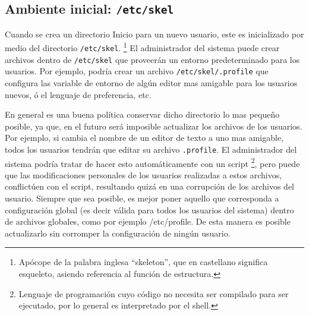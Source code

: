 \documentclass[12pt]{article}
\begin{document}

\subsection{Ambiente inicial: \texttt{/etc/skel}}

Cuando se crea un directorio Inicio para un nuevo usuario, este es
inicializado por medio del directorio \texttt{/etc/skel}. 
\footnote{Apócope de la palabra inglesa ``skeleton'', que en castellano 
significa esqueleto, asiendo referencia al función de estructura.} El
administrador del sistema puede crear archivos dentro de
\texttt{/etc/skel} que proveerán un entorno predeterminado
para los usuarios. Por ejemplo, podría crear un archivo 
\texttt{/etc/skel/.profile} que configura las variable de entorno
de algún editor mas amigable para los usuarios nuevos, ó el lenguaje 
de preferencia, etc. 


En general es una buena política conservar dicho directorio lo mas pequeño
posible, ya que, en el futuro será imposible actualizar los archivos de
los usuarios. Por ejemplo, si cambia el nombre de un editor de texto a uno mas amigable,
todos los usuarios tendrán que editar su archivo  \texttt{.profile}.
El administrador del sistema podría tratar de hacer esto automáticamente con un
script \footnote{Lenguaje de programación cuyo código no necesita ser
compilado para ser ejecutado, por lo general es interpretado por el shell.}, pero
puede que las modificaciones personales de los usuarios realizadas a estos 
archivos, conflictúen con el script, resultando quizá en una corrupción de 
los archivos del usuario. Siempre que sea posible, es mejor poner aquello que 
corresponda a configuración global (es decir válida para todos los usuarios del sistema)
dentro de archivos globales, como por ejemplo /etc/profile. De esta manera es posible
actualizarlo sin corromper la configuración de ningún usuario.  
\end{document}
